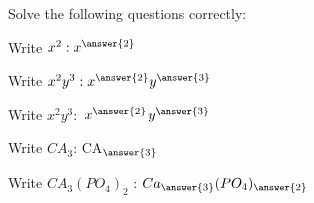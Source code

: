 \documentclass{ximera}
\begin{document}

    
    \displayOutcomes

    
    \begin{exercise} Solve the following questions correctly:

        \begin{question} Write $x^2: x^{\answer{2}}$
        \end{question}

        \begin{question} Write $x^2y^3: x^{\answer{2}}y^{\answer{3}}$
        \end{question}

        \begin{question} Write $x^2y^3:$ $x^{\answer{2}}${}$y^{\answer{3}}$
        \end{question}

        \begin{question} Write $CA_3$: CA${}_{\answer{3}}$
        \end{question}

        \begin{question} Write $CA_3(PO_4)_2$ : 
            $Ca_{\answer{3}}(PO_4)_{\answer{2}}$ 
        \end{question}

    \end{exercise}
\end{document}
